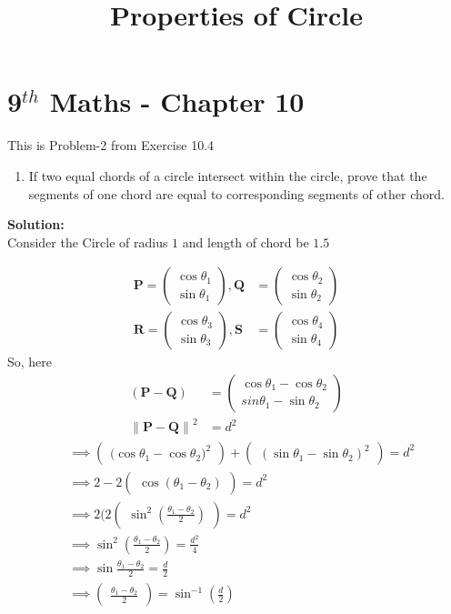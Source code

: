 \documentclass[12pt]{article}
\providecommand{\norm}[1]{\left\lVert#1\right\rVert}
\newcommand{\solution}{\noindent \textbf{Solution: }}
\newcommand{\myvec}[1]{\ensuremath{\begin{pmatrix}#1\end{pmatrix}}}
\let\vec\mathbf
\begin{document}
\begin{center}
\title{\textbf{Properties of Circle}}
\date{\vspace{-5ex}} %
\maketitle
\end{center}

\setcounter{page}{1}

\section{9$^{th}$ Maths - Chapter 10}

This is Problem-2 from Exercise 10.4

\begin{enumerate}
\item If two equal chords of a circle intersect within the circle, prove that the segments of one chord are equal to corresponding segments of other chord.
\end{enumerate}
\solution
\\
Consider the Circle of radius $1$ and length of chord be $1.5$
\begin{center}
\begin{table}[ht!]
	
\caption{}
\label{table}
\end{table}
\end{center}
\begin{align}
\vec{P}=\myvec{\cos{\theta_1}\\\sin{\theta_1}},
\vec{Q}&=\myvec{\cos{\theta_2}\\\sin{\theta_2}}\\
\vec{R}=\myvec{\cos{\theta_3}\\\sin{\theta_3}},
\vec{S}&=\myvec{\cos{\theta_4}\\\sin{\theta_4}}
\end{align}
So, here
\begin{align}
	(\vec{P}-\vec{Q})&=\myvec{{\cos\theta_1}-{\cos\theta_2}\\{sin\theta_1}-{\sin\theta_2}}\\
	\norm{\vec{P}-\vec{Q}}^2&=d^2
		\end{align}
		\begin{align*}
	&\implies\myvec{({\cos\theta_1}-{\cos\theta_2)}^2}+\myvec{({\sin\theta_1}-{\sin\theta_2})^2}=d^2\\
	&\implies2-2\myvec{\cos(\theta_1-\theta_2)}=d^2\\
	&\implies2(2\myvec{{\sin^2}(\frac{{\theta_1}-{\theta_2}}{2})}=d^2\\
	&\implies{\sin^2}(\frac{{\theta_1}-{\theta_2}}{2})=\frac{d^2}{4}\\
	&\implies\sin\frac{{\theta_1}-{\theta_2}}{2}=\frac{d}{2}\\
&\implies\myvec{\frac{{\theta_1}-{\theta_2}}{2}}=\sin^{-1}(\frac{d}{2})
	\end{align*}
\end{document}
